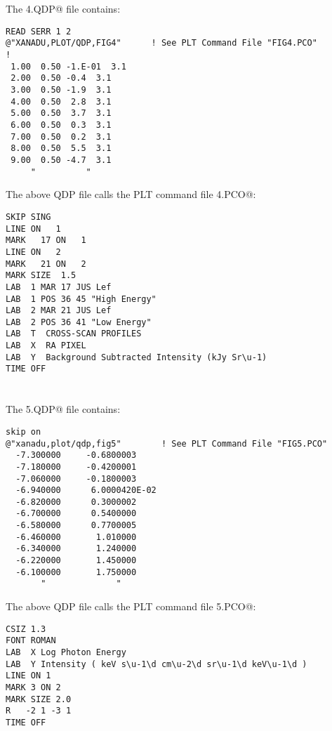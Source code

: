 \newpage
\section*{ }
\vspace{10cm}

\vfill
The \verb@FIG4.QDP@ file contains:
{\footnotesize
\begin{verbatim}
READ SERR 1 2
@"XANADU,PLOT/QDP,FIG4"      ! See PLT Command File "FIG4.PCO"
!
 1.00  0.50 -1.E-01  3.1
 2.00  0.50 -0.4  3.1
 3.00  0.50 -1.9  3.1
 4.00  0.50  2.8  3.1
 5.00  0.50  3.7  3.1
 6.00  0.50  0.3  3.1
 7.00  0.50  0.2  3.1
 8.00  0.50  5.5  3.1
 9.00  0.50 -4.7  3.1
     "          "
\end{verbatim}}

The above QDP file calls the PLT command file \verb@FIG4.PCO@:
{\footnotesize
\begin{verbatim}
SKIP SING
LINE ON   1
MARK   17 ON   1
LINE ON   2
MARK   21 ON   2
MARK SIZE  1.5
LAB  1 MAR 17 JUS Lef 
LAB  1 POS 36 45 "High Energy"
LAB  2 MAR 21 JUS Lef 
LAB  2 POS 36 41 "Low Energy"
LAB  T  CROSS-SCAN PROFILES
LAB  X  RA PIXEL
LAB  Y  Background Subtracted Intensity (kJy Sr\u-1)
TIME OFF
\end{verbatim}}

\newpage
\section*{ }
\vspace{10cm}

\vfill
The \verb@FIG5.QDP@ file contains:
{\footnotesize
\begin{verbatim}
skip on
@"xanadu,plot/qdp,fig5"        ! See PLT Command File "FIG5.PCO"
  -7.300000     -0.6800003
  -7.180000     -0.4200001
  -7.060000     -0.1800003
  -6.940000      6.0000420E-02
  -6.820000      0.3000002
  -6.700000      0.5400000
  -6.580000      0.7700005
  -6.460000       1.010000
  -6.340000       1.240000
  -6.220000       1.450000
  -6.100000       1.750000
       "              "

\end{verbatim}}
The above QDP file calls the PLT command file \verb@FIG5.PCO@:
{\footnotesize
\begin{verbatim}
CSIZ 1.3
FONT ROMAN
LAB  X Log Photon Energy 
LAB  Y Intensity ( keV s\u-1\d cm\u-2\d sr\u-1\d keV\u-1\d )
LINE ON 1
MARK 3 ON 2
MARK SIZE 2.0
R   -2 1 -3 1
TIME OFF
\end{verbatim}}

